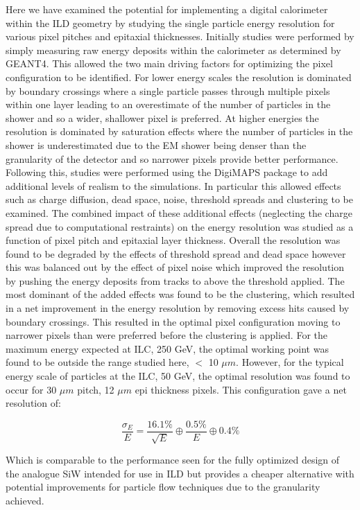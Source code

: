 Here we have examined the potential for implementing a digital calorimeter within the \ac{ILD} geometry by studying the single particle energy resolution for various pixel pitches and epitaxial thicknesses. Initially studies were performed by simply measuring raw energy deposits within the calorimeter as determined by GEANT4. This allowed the two main driving factors for optimizing the pixel configuration to be identified. For lower energy scales the resolution is dominated by boundary crossings where a single particle passes through multiple pixels within one layer leading to an overestimate of the number of particles in the shower and so a wider, shallower pixel is preferred. At higher energies the resolution is dominated by saturation effects where the number of particles in the shower is underestimated due to the EM shower being denser than the granularity of the detector and so narrower pixels provide better performance. Following this, studies were performed using the DigiMAPS package to add additional levels of realism to the simulations. In particular this allowed effects such as charge diffusion, dead space, noise, threshold spreads and clustering to be examined. The combined impact of these additional effects (neglecting the charge spread due to computational restraints) on the energy resolution was studied as a function of pixel pitch and epitaxial layer thickness. Overall the resolution was found to be degraded by the effects of threshold spread and dead space however this was balanced out by the effect of pixel noise which improved the resolution by pushing the energy deposits from tracks to above the threshold applied. The most dominant of the added effects was found to be the clustering, which resulted in a net improvement in the energy resolution by removing excess hits caused by boundary crossings. This resulted in the optimal pixel configuration moving to narrower pixels than were preferred before the clustering is applied. For the maximum energy expected at \ac{ILC}, 250 GeV, the optimal working point was found to be outside the range studied here, $<$ 10 $\mu m$. However, for the typical energy scale of particles at the \ac{ILC}, 50 GeV, the optimal resolution was found to occur for 30 $\mu m$ pitch, 12 $\mu m$ epi thickness pixels. This configuration gave a net resolution of:

\begin{equation}
  \frac{\sigma_E}{E}=\frac{16.1\%}{\sqrt{E}} \oplus \frac{0.5\%}{E} \oplus 0.4\%
\end{equation}

Which is comparable to the performance seen for the fully optimized design of the analogue SiW intended for use in \ac{ILD} but provides a cheaper alternative with potential improvements for particle flow techniques due to the granularity achieved. 
